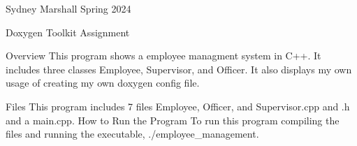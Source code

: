 Sydney Marshall Spring 2024

Doxygen Toolkit Assignment \begin{DoxyVerb}Overview
    This program shows a employee managment system in C++. It includes three classes Employee, Supervisor, and Officer. It also displays my own usage of creating my own doxygen config file. 

Files
    This program includes 7 files Employee, Officer, and Supervisor.cpp and .h and a main.cpp.
How to Run the Program
        To run this program compiling the files and running the executable, ./employee_management. 
\end{DoxyVerb}
 